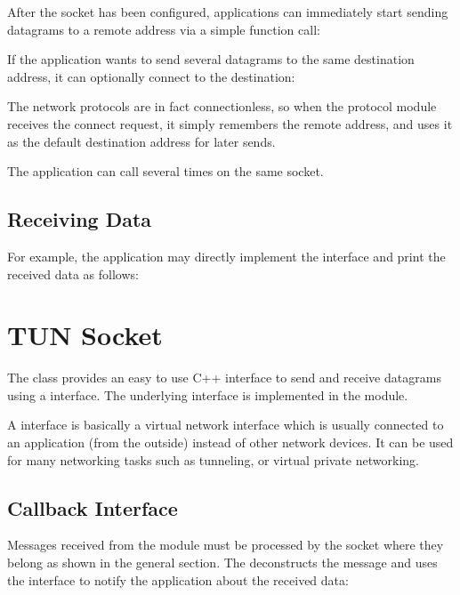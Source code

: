 After the socket has been configured, applications can immediately start sending
datagrams to a remote address via a simple function call:


If the application wants to send several datagrams to the same destination
address, it can optionally connect to the destination:


The network protocols are in fact connectionless, so when the protocol module
receives the connect request, it simply remembers the remote address, and uses
it as the default destination address for later sends.

The application can call  several times on the same socket.

\subsection*{Receiving Data}

For example, the application may directly implement the
 interface and print the received data as follows:


\section{TUN Socket}
\label{sec:sockets:tun-socket}

The  class provides an easy to use C++ interface to send and
receive datagrams using a  interface. The underlying
 interface is implemented in the  module.

A  interface is basically a virtual network interface which is
usually connected to an application (from the outside) instead of other network
devices. It can be used for many networking tasks such as tunneling, or virtual
private networking.

\subsection*{Callback Interface}

Messages received from the  module must be processed by the socket
where they belong as shown in the general section. The 
deconstructs the message and uses the  interface
to notify the application about the received data:

